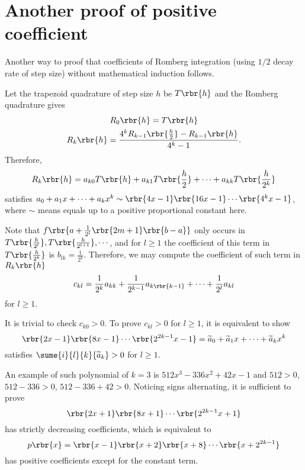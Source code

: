 \documentclass[english, nochinese]{../textmpls/pkupaper}
\title{\titlemark}
\author{\authoring}
\begin{document}
\maketitle

\section{Another proof of positive coefficient}

Another way to proof that coefficients of Romberg integration (using $ 1 / 2 $ decay rate of step size) without mathematical induction follows.

Let the trapezoid quadrature of step size $h$ be $ T \rbr{h} $ and the Romberg quadrature gives
\begin{gather}
R_0 \rbr{h} = T \rbr{h} \\
R_k \rbr{h} = \frac{ 4^k R_{ k - 1 } \rbr{\frac{h}{2}} - R_{ k - 1 } \rbr{h} }{ 4^k - 1 }.
\end{gather}
Therefore,
\begin{equation}
R_k \rbr{h} = a_{ k 0 } T \rbr{h} + a_{ k 1 } T \rbr{\frac{h}{2}} + \cdots + a_{ k k } T \rbr{\frac{h}{2^k}}
\end{equation}
satisfies $ a_0 + a_1 x + \cdots + a_k x^k \sim \rbr{ 4 x - 1 } \rbr{ 16 x - 1 } \cdots \rbr{ 4^k x - 1 } $, where $\sim$ means equals up to a positive proportional constant here.

Note that $ f \rbr{ a + \frac{1}{2^l} \rbr{ 2 m + 1 } \rbr{ b - a } } $ only occurs in $ T \rbr{\frac{h}{2^l}}, T \rbr{\frac{h}{2^{ l + 1 }}}, \cdots $, and for $ l \ge 1 $ the coefficient of this term in $ T \rbr{\frac{h}{2^k}} $ is $ b_{ l k } = \frac{1}{2^k} $. Therefore, we may compute the coefficient of such term in $ R_k \rbr{h} $
\begin{equation}
c_{ k l } = \frac{1}{2^k} a_{ k k } + \frac{1}{ 2^{ k - 1 } } a_{ k \rbr{ k - 1 } } + \cdots + \frac{1}{2^l} a_{ k l }
\end{equation}
for $ l \ge 1 $.

It is trivial to check $ c_{ k 0 } > 0 $. To prove $ c_{ k l } > 0 $ for $ l \ge 1 $, it is equivalent to show
\begin{equation}
\rbr{ 2 x - 1 } \rbr{ 8 x - 1 } \cdots \rbr{ 2^{ 2 k - 1 } x - 1 } = \widetilde{a}_0 + \widetilde{a}_1 x + \cdots + \widetilde{a}_k x^k
\end{equation}
satisfies $ \sume{i}{l}{k}{ \widetilde{a}_k } > 0 $ for $ l \ge 1 $.

An example of such polynomial of $ k = 3 $ is $ 512 x^3 - 336 x^2 + 42 x - 1 $ and $ 512 > 0 $, $ 512 - 336 > 0 $, $ 512 - 336 + 42 > 0 $. Noticing signs alternating, it is sufficient to prove
\begin{equation}
\rbr{ 2 x + 1 } \rbr{ 8 x + 1 } \cdots \rbr{ 2^{ 2 k - 1 } x + 1 }
\end{equation}
has strictly decreasing coefficients, which is equivalent to
\begin{equation}
p \rbr{x} = \rbr{ x - 1 } \rbr{ x + 2 } \rbr{ x + 8 } \cdots \rbr{ x + 2^{ 2 k - 1 } }
\end{equation}
has positive coefficients except for the constant term.
\end{document}
